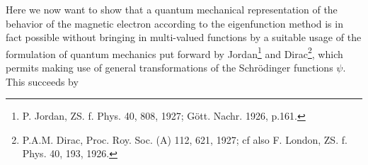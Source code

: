 \begin{paper}{1}
Here we now want to show that a quantum mechanical representation of the behavior of the magnetic electron according to the eigenfunction method is in fact possible without bringing in multi-valued functions by a suitable usage of the formulation of quantum mechanics put forward by Jordan\footnote{P. Jordan, ZS. f. Phys. 40, 808, 1927; G\"ott. Nachr. 1926, p.161.} and Dirac\footnote{P.A.M. Dirac, Proc. Roy. Soc. (A) 112, 621, 1927; cf also F. London, ZS. f. Phys. 40, 193, 1926.}, which permits making use of general transformations of the Schr\"odinger functions $\psi$. This succeeds by 


\end{paper}
